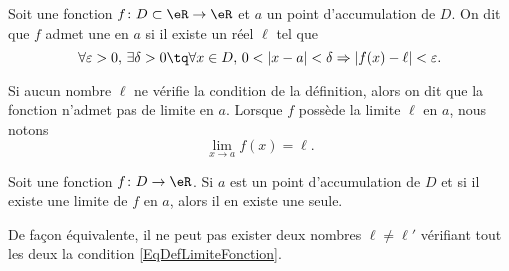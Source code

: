 \begin{definition}	\label{DefLimiteFonction}
	Soit une fonction $f\colon D\subset\eR\to \eR$ et $a$ un point d'accumulation de $D$. On dit que $f$ admet une  en $a$ si il existe un réel $\ell$ tel que 
	\begin{equation}\label{EqDefLimiteFonction}
		\forall\varepsilon>0,\,\exists\delta>0\tq \forall x\in D,\, 0<| x-a |<\delta\Rightarrow| f(x)-\ell |<\varepsilon.
	\end{equation}
\end{definition}

Si aucun nombre $\ell$ ne vérifie la condition de la définition, alors on dit que la fonction n'admet pas de limite en $a$. Lorsque $f$ possède la limite $\ell$ en $a$, nous notons
\begin{equation}
	\lim_{x\to a} f(x)=\ell.
\end{equation}

\begin{proposition}
	Soit une fonction $f\colon D\to \eR$. Si $a$ est un point d'accumulation de $D$ et si il existe une limite de $f$ en $a$, alors il en existe une seule. 
\end{proposition}

De façon équivalente, il ne peut pas exister deux nombres $\ell\neq\ell'$ vérifiant tout les deux la condition \eqref{EqDefLimiteFonction}.

